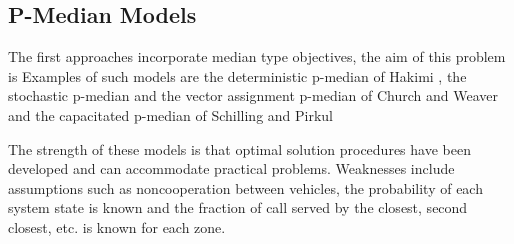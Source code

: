 \subsection{P-Median Models}
The first approaches
incorporate median type objectives,
the aim of this problem is
Examples of such models are
the deterministic p-median of Hakimi \cite{hakimi1964optimum},
the stochastic p-median and the vector assignment p-median of Church and Weaver
\cite{weaver1983computational,weaver1985median}
and the capacitated p-median of Schilling and Pirkul \cite{pirkul1988siting}

The strength of these models
is that optimal solution procedures
have been developed
and can accommodate practical problems.
Weaknesses include assumptions
such as noncooperation between vehicles,
the probability of each system state is known
and the fraction of call
served by the closest, second closest, etc.
is known for each zone.
